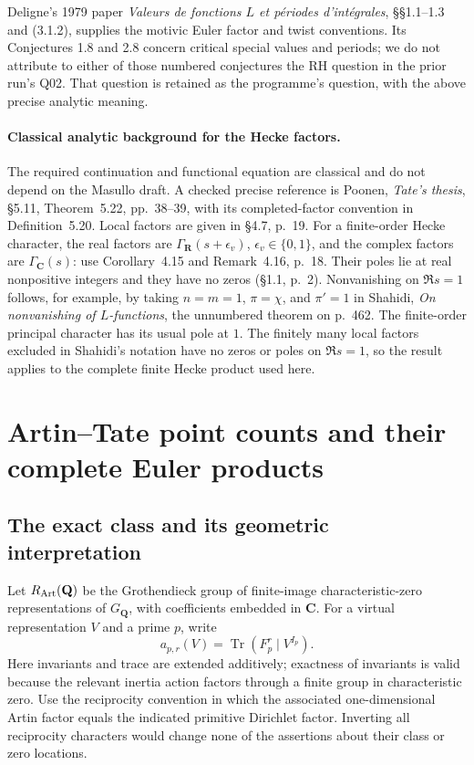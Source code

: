 \documentclass[11pt,a4paper]{article}
\theoremstyle{definition}
\begin{document}
Deligne's 1979 paper \emph{Valeurs de fonctions $L$ et p\'eriodes
d'int\'egrales}, \S\S1.1--1.3 and (3.1.2), supplies the motivic Euler
factor and twist conventions.  Its Conjectures 1.8 and 2.8 concern
critical special values and periods; we do not attribute to either of
those numbered conjectures the RH question in the prior run's Q02.
That question is retained as the programme's question, with the above
precise analytic meaning.


\paragraph{Classical analytic background for the Hecke factors.}
The required continuation and functional equation are classical and do not
depend on the Masullo draft.  A checked precise reference is Poonen,
\emph{Tate's thesis}, \S5.11, Theorem~5.22, pp.~38--39, with its
completed-factor convention in Definition~5.20.  Local factors are given
in \S4.7, p.~19.  For a finite-order Hecke character, the real factors are
$\Gamma_{\mathbf R}(s+\epsilon_v)$, $\epsilon_v\in\{0,1\}$, and the complex
factors are $\Gamma_{\mathbf C}(s)$: use Corollary~4.15 and Remark~4.16,
p.~18.  Their poles lie at real nonpositive integers and they have no
zeros (\S1.1, p.~2).
Nonvanishing on $\Re s=1$ follows, for example, by taking
$n=m=1$, $\pi=\chi$, and $\pi'=1$ in Shahidi,
\emph{On nonvanishing of $L$-functions}, the unnumbered theorem on p.~462.
The finite-order principal character has its usual pole at $1$.
The finitely many local factors excluded in Shahidi's notation have no
zeros or poles on $\Re s=1$, so the result applies to the complete finite
Hecke product used here.


\section{Artin--Tate point counts and their complete Euler products}
\label{sec:artin-tate}

\subsection{The exact class and its geometric interpretation}
Let $R_{\rm Art}(\mathbf Q)$ be the Grothendieck group of finite-image
characteristic-zero representations of $G_{\mathbf Q}$, with coefficients
embedded in $\mathbf C$.  For a virtual representation $V$ and a prime
$p$, write
\[
 a_{p,r}(V)=\operatorname{Tr}(F_p^r\mid V^{I_p}).
\]
Here invariants and trace are extended additively; exactness of invariants
is valid because the relevant inertia action factors through a finite
group in characteristic zero.  Use the reciprocity convention in which
the associated one-dimensional Artin factor equals the indicated
primitive Dirichlet factor.  Inverting all reciprocity characters would
change none of the assertions about their class or zero locations.
\end{document}
